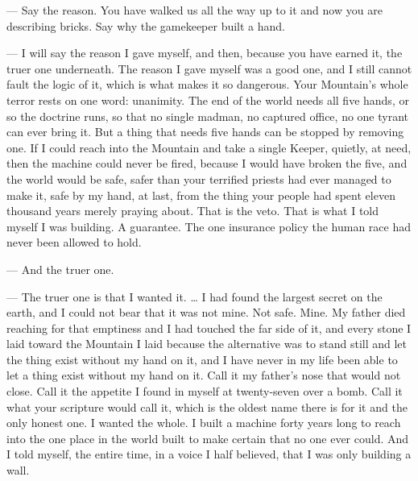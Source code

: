 \begin{room}

--- Say the reason. You have walked us all the way up to it and now you are describing bricks. Say why the gamekeeper built a hand.

--- I will say the reason I gave myself, and then, because you have earned it, the truer one underneath. The reason I gave myself was a good one, and I still cannot fault the logic of it, which is what makes it so dangerous. Your Mountain's whole terror rests on one word: unanimity. The end of the world needs all five hands, or so the doctrine runs, so that no single madman, no captured office, no one tyrant can ever bring it. But a thing that needs five hands can be stopped by removing one. If I could reach into the Mountain and take a single Keeper, quietly, at need, then the machine could never be fired, because I would have broken the five, and the world would be safe, safer than your terrified priests had ever managed to make it, safe by my hand, at last, from the thing your people had spent eleven thousand years merely praying about. That is the veto. That is what I told myself I was building. A guarantee. The one insurance policy the human race had never been allowed to hold.

--- And the truer one.

--- The truer one is that I wanted it. \ldots{} I had found the largest secret on the earth, and I could not bear that it was not mine. Not safe. Mine. My father died reaching for that emptiness and I had touched the far side of it, and every stone I laid toward the Mountain I laid because the alternative was to stand still and let the thing exist without my hand on it, and I have never in my life been able to let a thing exist without my hand on it. Call it my father's nose that would not close. Call it the appetite I found in myself at twenty-seven over a bomb. Call it what your scripture would call it, which is the oldest name there is for it and the only honest one. I wanted the whole. I built a machine forty years long to reach into the one place in the world built to make certain that no one ever could. And I told myself, the entire time, in a voice I half believed, that I was only building a wall.

\end{room}

